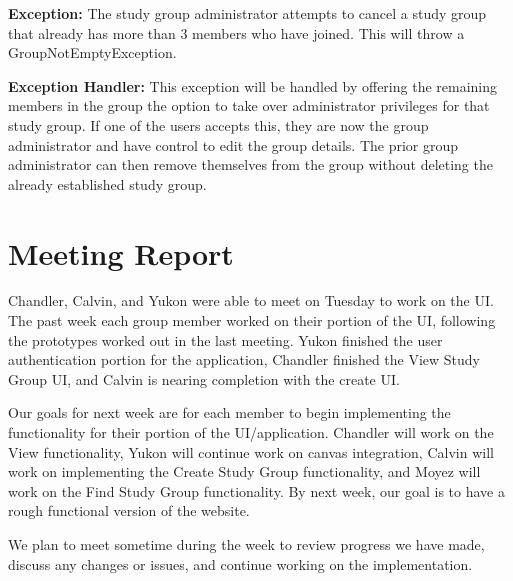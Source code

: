 \documentclass[12pt,letterpaper]{article}
\begin{document}
\textbf{Exception:} The study group administrator attempts to cancel a study group that already has more than 3 members who have joined. This will throw a GroupNotEmptyException. %

\textbf{Exception Handler:} This exception will be handled by offering the remaining members in the group the option to take over administrator privileges for that study group. If one of the users accepts this, they are now the group administrator and have control to edit the group details. The prior group administrator can then remove themselves from the group without deleting the already established study group. 

\clearpage
\section{Meeting Report}
Chandler, Calvin, and Yukon were able to meet on Tuesday to work on the UI. The past week each group member worked on their portion of the UI, following the prototypes worked out in the last meeting. Yukon finished the user authentication portion for the application, Chandler finished the View Study Group UI, and Calvin is nearing completion with the create UI.

Our goals for next week are for each member to begin implementing the functionality for their portion of the UI/application. Chandler will work on the View functionality, Yukon will continue work on canvas integration, Calvin will work on implementing the Create Study Group functionality, and Moyez will work on the Find Study Group functionality. By next week, our goal is to have a rough functional version of the website.

We plan to meet sometime during the week to review progress we have made, discuss any changes or issues, and continue working on the implementation.
\end{document}
